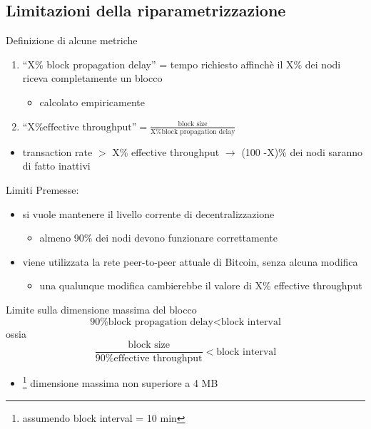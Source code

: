 \documentclass{beamer}
\begin{document}
  \subsection{Limitazioni della riparametrizzazione}
  \begin{frame}{Definizione di alcune metriche}
      \begin{enumerate}
          \item ``X\% block propagation delay'' = tempo richiesto affinchè il X\% dei nodi riceva completamente un blocco
          \begin{itemize}
              \item[\MVRightarrow] calcolato empiricamente
          \end{itemize}
          \item $\text{``X\% effective throughput''} = \frac{\text{block size}}{\text{X\% block propagation delay}}$
      \end{enumerate}
      \begin{itemize}
          \item transaction rate $>$ X\% effective throughput $\rightarrow$ (100 -X)\% dei nodi saranno di fatto inattivi
      \end{itemize}
  \end{frame} 
  
  
  \begin{frame}{Limiti}
    Premesse:
    \begin{itemize}
        \item si vuole mantenere il livello corrente di decentralizzazione 
        \begin{itemize}
            \item[\MVRightarrow] almeno 90\% dei nodi devono funzionare correttamente
        \end{itemize}
        \item viene utilizzata la rete peer-to-peer attuale di Bitcoin, senza alcuna modifica
        \begin{itemize}
            \item[\MVRightarrow] una qualunque modifica cambierebbe il valore di X\% effective throughput
        \end{itemize}
    \end{itemize}
    
    \begin{block}{Limite sulla dimensione massima del blocco}
        \[ \text{90\% block propagation delay} < \text{block interval} \]
        ossia 
        \[ \frac{\text{block size}}{\text{90\% effective throughput}} < \text{block interval} \]
        \begin{itemize}
            \item[\MVRightarrow] \footnote{assumendo block interval = 10 min} dimensione massima non superiore a 4 MB
        \end{itemize}
    \end{block}
  \end{frame}
  
\end{document}
